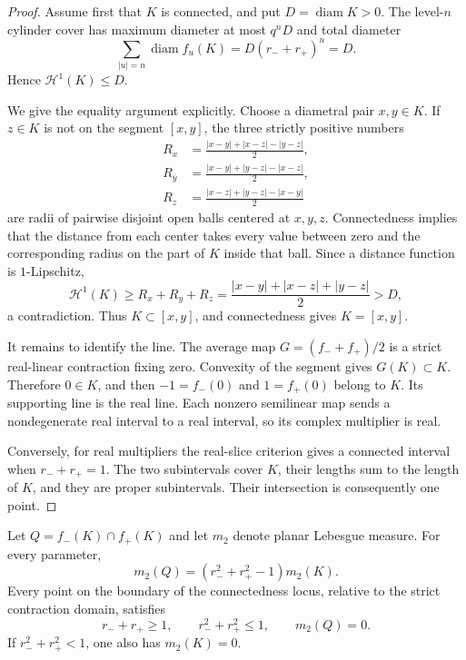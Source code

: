 \begin{proof}
Assume first that $K$ is connected, and put $D=\operatorname{diam}K>0$.
The level-$n$ cylinder cover has maximum diameter at most $q^nD$ and
total diameter
\[
 \sum_{|u|=n}\operatorname{diam}f_u(K)
   =D(r_-+r_+)^n=D.
\]
Hence $\mathcal H^1(K)\le D$.

We give the equality argument explicitly. Choose a diametral pair
$x,y\in K$. If $z\in K$ is not on the segment $[x,y]$, the three
strictly positive numbers
\[
 \begin{aligned}
 R_x&=\frac{|x-y|+|x-z|-|y-z|}{2},\\
 R_y&=\frac{|x-y|+|y-z|-|x-z|}{2},\\
 R_z&=\frac{|x-z|+|y-z|-|x-y|}{2}
 \end{aligned}
\]
are radii of pairwise disjoint open balls centered at $x,y,z$.
Connectedness implies that the distance from each center takes every
value between zero and the corresponding radius on the part of $K$
inside that ball. Since a distance function is $1$-Lipschitz,
\[
 \mathcal H^1(K)\ge R_x+R_y+R_z
   =\frac{|x-y|+|x-z|+|y-z|}{2}>D,
\]
a contradiction. Thus $K\subset[x,y]$, and connectedness gives
$K=[x,y]$.

It remains to identify the line. The average map
$G=(f_-+f_+)/2$ is a strict real-linear contraction fixing zero.
Convexity of the segment gives $G(K)\subset K$. Therefore
$0\in K$, and then $-1=f_-(0)$ and $1=f_+(0)$ belong to $K$.
Its supporting line is the real line. Each nonzero semilinear map
sends a nondegenerate real interval to a real interval, so its complex
multiplier is real.

Conversely, for real multipliers the real-slice criterion gives a
connected interval when $r_-+r_+=1$. The two subintervals cover $K$,
their lengths sum to the length of $K$, and they are proper
subintervals. Their intersection is consequently one point.
\end{proof}

\begin{proposition}
\label{prop:restored-contact-area}
Let $Q=f_-(K)\cap f_+(K)$ and let $m_2$ denote planar Lebesgue measure.
For every parameter,
\begin{equation}\label{eq:restored-contact-area}
 m_2(Q)=(r_-^2+r_+^2-1)m_2(K).
\end{equation}
Every point on the boundary of the connectedness locus, relative to
the strict contraction domain, satisfies
\[
 r_-+r_+\ge1,\qquad r_-^2+r_+^2\le1,
 \qquad m_2(Q)=0.
\]
If $r_-^2+r_+^2<1$, one also has $m_2(K)=0$.
\end{proposition}

